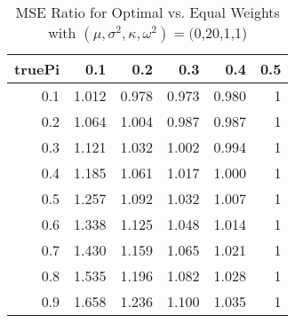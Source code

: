\begin{table}

\caption{\label{tab:}MSE Ratio for Optimal vs. Equal Weights with $(\mu, \sigma^2, \kappa, \omega^2) = ($0,20,1,1)}
\centering
\begin{tabular}[t]{rrrrrr}
\toprule
truePi & 0.1 & 0.2 & 0.3 & 0.4 & 0.5\\
\midrule
0.1 & 1.012 & 0.978 & 0.973 & 0.980 & 1\\
0.2 & 1.064 & 1.004 & 0.987 & 0.987 & 1\\
0.3 & 1.121 & 1.032 & 1.002 & 0.994 & 1\\
0.4 & 1.185 & 1.061 & 1.017 & 1.000 & 1\\
0.5 & 1.257 & 1.092 & 1.032 & 1.007 & 1\\
0.6 & 1.338 & 1.125 & 1.048 & 1.014 & 1\\
0.7 & 1.430 & 1.159 & 1.065 & 1.021 & 1\\
0.8 & 1.535 & 1.196 & 1.082 & 1.028 & 1\\
0.9 & 1.658 & 1.236 & 1.100 & 1.035 & 1\\
\bottomrule
\end{tabular}
\end{table}
